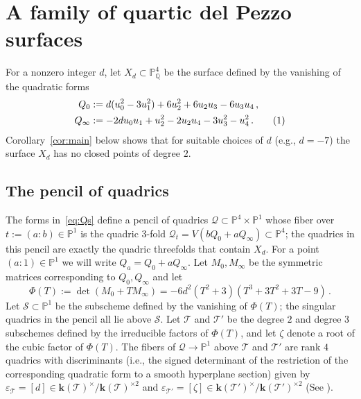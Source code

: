 \documentclass[12pt, reqno]{amsart}
\theoremstyle{definition}
\newcommand{\PP}{{\mathbb P}}
\newcommand{\Q}{{\mathbb Q}}
\newcommand{\kk}{{\mathbf k}}
\newcommand{\scrS}{{\mathscr S}}
\newcommand{\scrT}{{\mathscr T}}
\newcommand{\eps}{\varepsilon}
\newcommand\numberthis{\addtocounter{equation}{1}\tag{\theequation}}
\begin{document}
\section{A family of quartic del Pezzo surfaces}\label{sec:Local}
   For a nonzero integer $d$, let $X_d \subset \PP^4_\Q$ be the surface defined by the vanishing of the quadratic forms
\begin{align*}
	Q_0 &:= d(u_0^2 - 3u_1^2) + 6u_2^2 + 6u_2u_3 - 6u_3u_4\,,\\
	Q_\infty &:= -2du_0u_1 + u_2^2 - 2u_2u_4 - 3u_3^2 - u_4^2\,.\numberthis\label{eq:Qs}
\end{align*}
Corollary~\ref{cor:main} below shows that for suitable choices of $d$ (e.g., $d = -7$) the surface $X_d$ has no closed points of degree $2$.

\subsection{The pencil of quadrics}
The forms in~\eqref{eq:Qs} define a pencil of quadrics $\mathscr{Q} \subset \PP^4 \times \PP^1$ whose fiber over $t := (a:b) \in \PP^1$ is the quadric $3$-fold $\mathscr{Q}_t = V(bQ_0 + aQ_\infty) \subset \PP^4$; the quadrics in this pencil are exactly the quadric threefolds that contain \(X_d\). For a point $(a:1) \in \PP^1$ we will write $Q_a = Q_0 + aQ_\infty$. Let $M_0,M_\infty$ be the symmetric matrices corresponding to $Q_0,Q_\infty$ and let 
\[
	\Phi(T) := \det(M_0 + TM_\infty) = -6d^2(T^2+3)(T^3 + 3T^2 + 3T - 9)\,.
\]
Let $\scrS \subset \PP^1$ be the subscheme defined by the vanishing of $\Phi(T)$; the singular quadrics in the pencil all lie above $\scrS$. Let $\scrT$ and $\scrT'$ be the degree $2$ and degree $3$ subschemes defined by the irreducible factors of $\Phi(T)$, and let \(\zeta\) denote a root of the cubic factor of \(\Phi(T)\). The fibers of $\mathscr{Q} \to \PP^1$ above $\scrT$ and $\scrT'$ are rank $4$ quadrics with discriminants (i.e., the signed determinant of the restriction of the corresponding quadratic form to a smooth hyperplane section) given by $\eps_\scrT = [d]\in\kk(\scrT)^\times/\kk(\scrT)^{\times 2}$ and $\eps_{\scrT'} = [\zeta]\in\kk(\scrT')^\times/\kk(\scrT')^{\times 2}$ (See \cite[Section 4A]{CV}).
\end{document}
